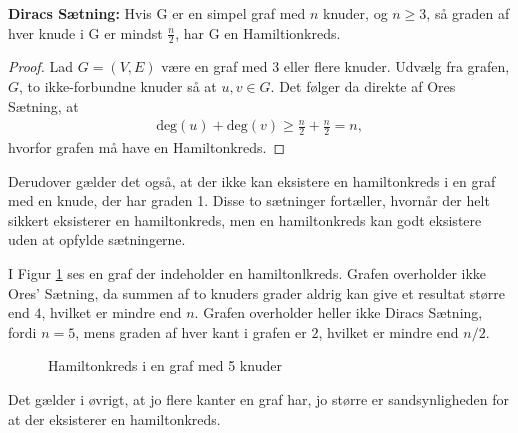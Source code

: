 \begin{thm} \label{diracs_thm}
\textbf{Diracs Sætning:} 
Hvis G er en simpel graf med $n$ knuder, og $n\geq3$, så graden af hver knude i G er mindst $\frac{n}{2}$, har G en Hamiltionkreds.  
\end{thm}

\begin{proof}
Lad $G=(V,E)$ være en graf med 3 eller flere knuder. Udvælg fra grafen, $G$, to ikke-forbundne knuder så at $u,v \in G$. Det følger da direkte af Ores Sætning, at
\begin{align*}
\textrm{deg}(u) + \textrm{deg}(v) \geq \frac{n}{2} + \frac{n}{2} = n,
\end{align*}
hvorfor grafen må have en Hamiltonkreds.
\end{proof}

Derudover gælder det også, at der ikke kan eksistere en hamiltonkreds i en graf med en knude, der har graden 1. 
Disse to sætninger fortæller, hvornår der helt sikkert eksisterer en hamiltonkreds, men en hamiltonkreds kan godt eksistere uden at opfylde sætningerne. 

\begin{exmp}
I Figur \ref{pentagon} ses en graf der indeholder en hamiltonlkreds.
Grafen overholder ikke Ores' Sætning, da summen af to knuders grader aldrig kan give et resultat større end $4$, hvilket er mindre end $n$.
Grafen overholder heller ikke Diracs Sætning, fordi $n=5$, mens graden af hver kant i grafen er $2$, hvilket er mindre end $n/2$.


\begin{figure}[h]
\centering

\caption{Hamiltonkreds i en graf med 5 knuder}
\label{pentagon}
\end{figure}

\end{exmp}

Det gælder i øvrigt, at jo flere kanter en graf har, jo større er sandsynligheden for at der eksisterer en hamiltonkreds. 
